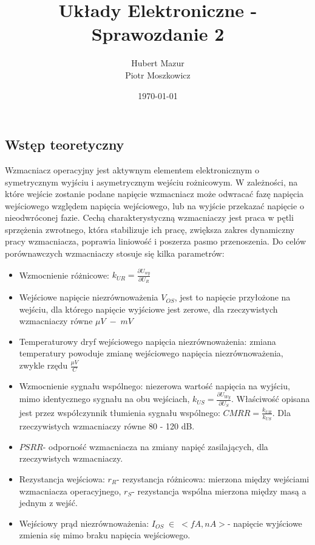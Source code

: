 \documentclass[a4paper,12pt]{article}
\begin{document}
\title{Układy Elektroniczne - Sprawozdanie 2}
\author{Hubert Mazur \\ Piotr Moszkowicz} 
\date{\today}
\maketitle
{}

\newpage
\begin{justify}
\tableofcontents
\newpage
{}

\section{Wstęp teoretyczny}
Wzmacniacz operacyjny jest aktywnym elementem elektronicznym o symetrycznym wyjściu i asymetrycznym wejściu rożnicowym. W zależności, na które wejście zostanie podane napięcie wzmacniacz może odwracać fazę napięcia wejściowego względem napięcia wejściowego, lub na wyjście przekazać napięcie o nieodwróconej fazie. Cechą charakterystyczną wzmacniaczy jest praca w pętli sprzężenia zwrotnego, która stabilizuje ich pracę, zwiększa zakres dynamiczny pracy wzmacniacza, poprawia liniowość i poszerza pasmo przenoszenia. Do celów porównawczych wzmacniaczy stosuje się kilka parametrów:

\begin{itemize}
\item Wzmocnienie różnicowe: $ k_{UR} = \frac{ \partial U_{wy}}{ \partial U_R} $ 
\item Wejściowe napięcie niezrównoważenia $ V_{OS} $, jest to napięcie przyłożone na wejściu, dla którego napięcie wyjściowe jest zerowe, dla rzeczywistych wzmacniaczy równe $ \mu V \; - \; mV $ 
\item Temperaturowy dryf wejściowego napięcia niezrównoważenia: zmiana temperatury powoduje zmianę wejściowego napięcia niezrównoważenia, zwykle rzędu $\frac {\mu V}{C} $
\item Wzmocnienie sygnału wspólnego:  niezerowa wartość napięcia na wyjściu, mimo identycznego sygnału na obu wejściach, $ k_{US} = \frac{\partial U_{Wy}}{\partial U_S}$. Właściwość opisana jest przez współczynnik tłumienia sygnału wspólnego: $ CMRR = \frac{k_{UR}}{k_{US}}$. Dla rzeczywistych wzmacniaczy równe  80 - 120 dB. 
\item $ PSRR $- odporność wzmacniacza na zmiany napięć zasilających, dla rzeczywistych wzmacniaczy.
\item Rezystancja wejściowa: $ r_R $- rezystancja różnicowa: mierzona między wejściami wzmacniacza operacyjnego, $ r_S $- rezystancja wspólna mierzona między masą a jednym z wejść.
\item Wejściowy prąd niezrównoważenia: $ I_{OS}  \; \in \; <fA,nA> $- napięcie wyjściowe zmienia się mimo braku napięcia wejściowego. 
\end{itemize}


\end{justify}
\end{document}
